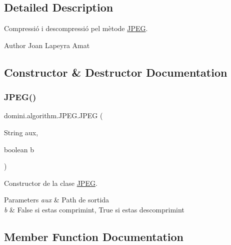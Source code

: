 \subsection{Detailed Description}
Compressió i descompressió pel mètode \hyperlink{classdomini_1_1algorithm_1_1JPEG}{J\+P\+EG}. 

\begin{DoxyAuthor}{Author}
Joan Lapeyra Amat 
\end{DoxyAuthor}


\subsection{Constructor \& Destructor Documentation}
\mbox{\label{classdomini_1_1algorithm_1_1JPEG_a9dce5a80ccc8b626758cb4ae0b93e056}} 
\subsubsection{\texorpdfstring{J\+P\+E\+G()}{JPEG()}}
{\footnotesize\ttfamily domini.\+algorithm.\+J\+P\+E\+G.\+J\+P\+EG (\begin{DoxyParamCaption}\item[{String}]{aux,  }\item[{boolean}]{b }\end{DoxyParamCaption})\hspace{0.3cm}{\ttfamily [inline]}}



Constructor de la clase \hyperlink{classdomini_1_1algorithm_1_1JPEG}{J\+P\+EG}. 


\begin{DoxyParams}{Parameters}
{\em aux} & Path de sortida \\
\hline
{\em b} & False si estas comprimint, True si estas descomprimint \\
\hline
\end{DoxyParams}


\subsection{Member Function Documentation}
\mbox{\label{classdomini_1_1algorithm_1_1JPEG_a058b0ee7eb44bbaec4078b5fc32c5107}} 
